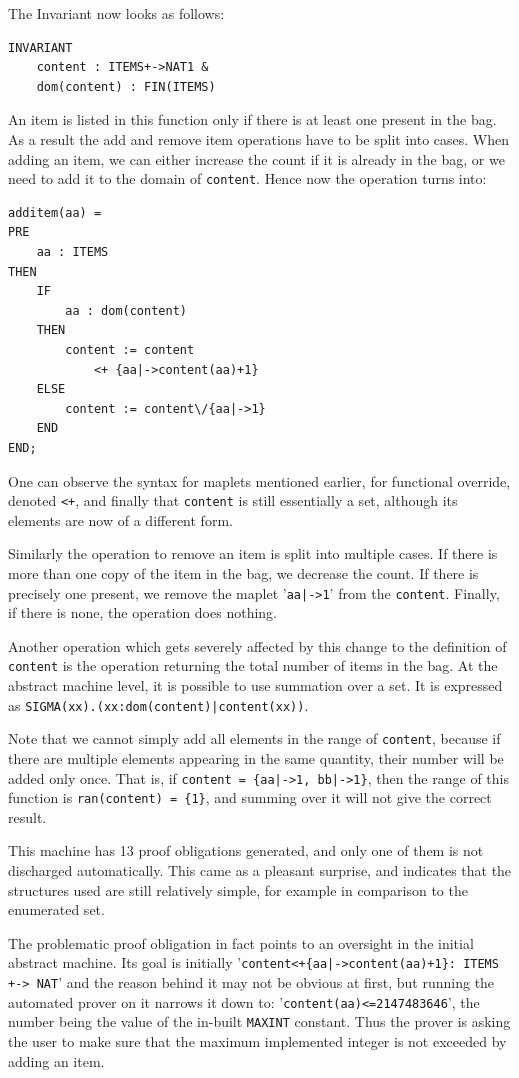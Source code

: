 \documentclass[12pt,journal,duplex]{IEEEtran}
\begin{document}
	The Invariant now looks as follows:
	\begin{lstlisting}
INVARIANT
	content : ITEMS+->NAT1 &
	dom(content) : FIN(ITEMS)
	\end{lstlisting}

	An item is listed in this function only if there is at least one present in the bag. As a result the add and remove item operations have to be split into cases. When adding an item, we can either increase the count if it is already in the bag, or we need to add it to the domain of \texttt{content}. Hence now the operation turns into:
	\begin{lstlisting}
additem(aa) =
PRE
	aa : ITEMS
THEN
	IF
		aa : dom(content)
	THEN
		content := content
			<+ {aa|->content(aa)+1}
	ELSE
		content := content\/{aa|->1}
	END
END;
	\end{lstlisting}
	One can observe the syntax for maplets mentioned earlier, for functional override, denoted \texttt{<+}, and finally that \texttt{content} is still essentially a set, although its elements are now of a different form.

	Similarly the operation to remove an item is split into multiple cases. If there is more than one copy of the item in the bag, we decrease the count. If there is precisely one present, we remove the maplet '\texttt{aa|->1}' from the \texttt{content}. Finally, if there is none, the operation does nothing.

	Another operation which gets severely affected by this change to the definition of \texttt{content} is the operation returning the total number of items in the bag. At the abstract machine level, it is possible to use summation over a set. It is expressed as \verb=SIGMA(xx).(xx:dom(content)|content(xx))=.

	Note that we cannot simply add all elements in the range of \texttt{content}, because if there are multiple elements appearing in the same quantity, their number will be added only once. That is, if \texttt{content = \{aa|->1, bb|->1\}}, then the range of this function is \texttt{ran(content) = \{1\}}, and summing over it will not give the correct result.

	This machine has 13 proof obligations generated, and only one of them is not discharged automatically. This came as a pleasant surprise, and indicates that the structures used are still relatively simple, for example in comparison to the enumerated set.

	The problematic proof obligation in fact points to an oversight in the initial abstract machine. Its goal is initially '\texttt{content<+\{aa|->content(aa)+1\}: ITEMS +-> NAT}' and the reason behind it may not be obvious at first, but running the automated prover on it narrows it down to: '\texttt{content(aa)<=2147483646}', the number being the value of the in-built \texttt{MAXINT} constant. Thus the prover is asking the user to make sure that the maximum implemented integer is not exceeded by adding an item.
\end{document}
